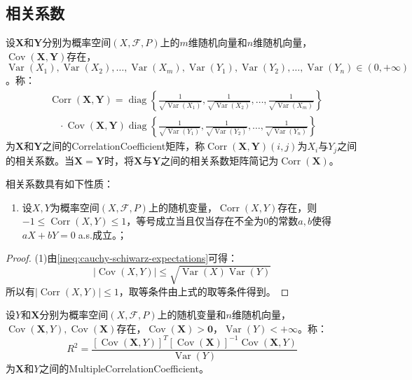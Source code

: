 \subsection{相关系数}
\begin{definition}
	设$\mathbf{X}$和$\mathbf{Y}$分别为概率空间$(X,\mathscr{F},P)$上的$m$维随机向量和$n$维随机向量，$\operatorname{Cov}(\mathbf{X},\mathbf{Y})$存在，$\operatorname{Var}(X_1),\operatorname{Var}(X_2),\dots,\operatorname{Var}(X_m),\operatorname{Var}(Y_1),\operatorname{Var}(Y_2),\dots,\operatorname{Var}(Y_n)\in(0,+\infty)$。称：
	\begin{align*}
		&\operatorname{Corr}(\mathbf{X},\mathbf{Y})=\operatorname{diag}\left\{\frac{1}{\sqrt{\operatorname{Var}(X_1)}},\frac{1}{\sqrt{\operatorname{Var}(X_2)}},\dots,\frac{1}{\sqrt{\operatorname{Var}(X_m)}}\right\} \\
		&\quad\cdot\operatorname{Cov}(\mathbf{X},\mathbf{Y})\operatorname{diag}\left\{\frac{1}{\sqrt{\operatorname{Var}(Y_1)}},\frac{1}{\sqrt{\operatorname{Var}(Y_2)}},\dots,\frac{1}{\sqrt{\operatorname{Var}(Y_n)}}\right\}
	\end{align*}
	为$\mathbf{X}$和$\mathbf{Y}$之间的\gls{CorrelationCoefficient}矩阵，称$\operatorname{Corr}(\mathbf{X},\mathbf{Y})(i,j)$为$X_i$与$Y_j$之间的相关系数。当$\mathbf{X}=\mathbf{Y}$时，将$\mathbf{X}$与$\mathbf{Y}$之间的相关系数矩阵简记为$\operatorname{Corr}(\mathbf{X})$。
\end{definition}
\begin{property}\label{prop:CorrelationCoefficient}
	相关系数具有如下性质：
	\begin{enumerate}
		\item 设$X,Y$为概率空间$(X,\mathscr{F},P)$上的随机变量，$\operatorname{Corr}(X,Y)$存在，则$-1\leqslant\operatorname{Corr}(X,Y)\leqslant1$，等号成立当且仅当存在不全为$0$的常数$a,b$使得$aX+bY=0\;$a.s.成立。；
	\end{enumerate}
\end{property}
\begin{proof}
	(1)由\cref{ineq:cauchy-schiwarz-expectations}可得：
	\begin{equation*}
		|\operatorname{Cov}(X,Y)|\leqslant\sqrt{\operatorname{Var}(X)\operatorname{Var}(Y)}
	\end{equation*}
	所以有$|\operatorname{Corr}(X,Y)|\leqslant1$，取等条件由上式的取等条件得到。
\end{proof}
\begin{definition}
	设$Y$和$\mathbf{X}$分别为概率空间$(X,\mathscr{F},P)$上的随机变量和$n$维随机向量，$\operatorname{Cov}(\mathbf{X},Y),\operatorname{Cov}(\mathbf{X})$存在，$\operatorname{Cov}(\mathbf{X})>\mathbf{0}$，$\operatorname{Var}(Y)<+\infty$。称：
	\begin{equation*}
		R^2=\frac{[\operatorname{Cov}(\mathbf{X},Y)]^T[\operatorname{Cov}(\mathbf{X})]^{-1}\operatorname{Cov}(\mathbf{X},Y)}{\operatorname{Var}(Y)}
	\end{equation*}
	为$\mathbf{X}$和$Y$之间的\gls{MultipleCorrelationCoefficient}。
\end{definition}
